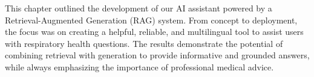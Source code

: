 This chapter outlined the development of our AI assistant powered by a Retrieval-Augmented Generation (RAG) system. From concept to deployment, the focus was on creating a helpful, reliable, and multilingual tool to assist users with respiratory health questions. The results demonstrate the potential of combining retrieval with generation to provide informative and grounded answers, while always emphasizing the importance of professional medical advice.
